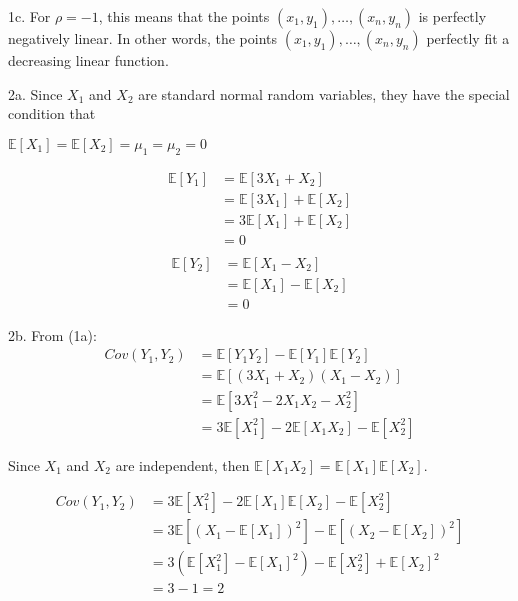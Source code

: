 \documentclass[12pt]{article}
\begin{document}
1c. For $\rho = -1$, this means that the points $(x_1, y_1), \ldots, (x_n,y_n)$ is perfectly negatively linear. In other words, the points $(x_1, y_1), \ldots, (x_n,y_n)$ perfectly fit a decreasing linear function.

\newpage

2a. Since $X_1$ and $X_2$ are standard normal random variables, they have the special condition that
\begin{center}
$\mathbb{E}[X_1] = \mathbb{E}[X_2] = \mu_1 = \mu_2 = 0$
\end{center}
\begin{multicols}{2}
\begin{align} \nonumber
\mathbb{E}[Y_1] &= \mathbb{E}[3X_1+X_2] \\ \nonumber
&=\mathbb{E}[3X_1]+\mathbb{E}[X_2] \\ \nonumber
&=3\mathbb{E}[X_1]+\mathbb{E}[X_2] \\ \nonumber
&=0
\end{align}
\columnbreak
\begin{align} \nonumber \\ \nonumber
\mathbb{E}[Y_2] &= \mathbb{E}[X_1-X_2] \\ \nonumber
&=\mathbb{E}[X_1]-\mathbb{E}[X_2] \\ \nonumber
&=0
\end{align}
\end{multicols}

2b. From (1a):
\begin{align} \nonumber
Cov(Y_1,Y_2) &= \mathbb{E}[Y_1Y_2] - \mathbb{E}[Y_1]\mathbb{E}[Y_2] \\ \nonumber
&= \mathbb{E}[(3X_1 + X_2)(X_1-X_2)] \\ \nonumber
&= \mathbb{E}[3X_1^2 - 2X_1X_2 - X_2^2] \\ \nonumber
&= 3\mathbb{E}[X_1^2] - 2\mathbb{E}[X_1X_2] - \mathbb{E}[X_2^2]
\end{align}
\begin{center}
Since $X_1$ and $X_2$ are independent, then $\mathbb{E}[X_1X_2] = \mathbb{E}[X_1]\mathbb{E}[X_2]$. \\
\end{center}
\begin{align} \nonumber
Cov(Y_1,Y_2) &= 3\mathbb{E}[X_1^2] - 2\mathbb{E}[X_1]\mathbb{E}[X_2] - \mathbb{E}[X_2^2] \\ \nonumber
&= 3\mathbb{E}[(X_1 - \mathbb{E}[X_1])^2] - \mathbb{E}[(X_2 - \mathbb{E}[X_2])^2] \\ \nonumber
&= 3(\mathbb{E}[X_1^2]-\mathbb{E}[X_1]^2)-\mathbb{E}[X_2^2]+\mathbb{E}[X_2]^2 \\ \nonumber
&= 3 - 1 = 2
\end{align}
\end{document}
